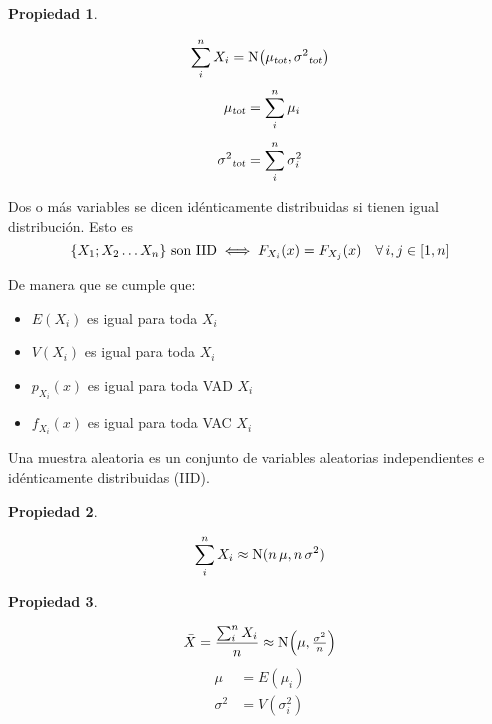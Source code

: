 \documentclass[a5paper,12pt,twoside]{book}
\newtheorem{prop}{{Propiedad}}[chapter]
\begin{document}
\begin{mdframed}[style=MyFrame1]
    \begin{prop}
        \label{prop:TCL}
    \end{prop}
    \begin{equation*}
        \sum_i^n X_i = \fx[\nor]{\sub{\mu}{tot},\sub{\sigma^2}{tot}}
    \end{equation*}
    \begin{align*}
        \sub{\mu}{tot} &= \sum_i^n \mu_i
        \\[1ex]
        \sub{\sigma^2}{tot} &= \sum_i^n \sigma_i^2
    \end{align*}
\end{mdframed}

Dos o más variables se dicen idénticamente distribuidas si tienen igual distribución. Esto es
\begin{equation*}
    \braces{X_1;X_2 \dots X_n} \text{ son IID} \iff F_{X_i}(x)=F_{X_j}(x) \quad \forall \, i,j \in [1,n]
\end{equation*}

De manera que se cumple que:
\begin{itemize}
    \item $E(X_i)$ es igual para toda $X_i$
    \item $V(X_i)$ es igual para toda $X_i$
    \item $p_{X_i}(x)$ es igual para toda VAD $X_i$
    \item $f_{X_i}(x)$ es igual para toda VAC $X_i$
\end{itemize}

Una muestra aleatoria es un conjunto de variables aleatorias independientes e idénticamente distribuidas (IID).

\begin{mdframed}[style=MyFrame1]
    \begin{prop}
    \end{prop}
    \begin{equation*}
        \sum_i^n X_i \approx \nor(n \, \mu , n \, \sigma^2)
    \end{equation*}
\end{mdframed}

\begin{mdframed}[style=MyFrame1]
    \begin{prop}
    \end{prop}
    \begin{equation*}
        \ave{X} = \dfrac{\sum_i^n X_i}{n} \approx \fx[\nor]{\mu, \tfrac{\sigma^2}{n}}
    \end{equation*}
    \begin{align*}
        \mu &= E(\mu_i) 
        \\
        \sigma^2 &= V(\sigma_i^2)
    \end{align*}
\end{mdframed}
\end{document}

